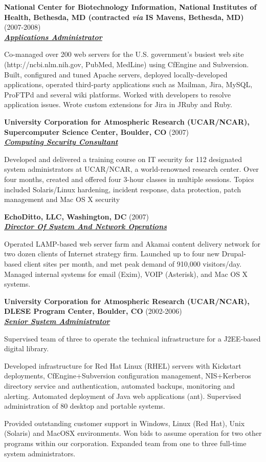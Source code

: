 \documentclass{article}
\newcommand{\employer}[3]{{ \textbf{#1} (#2)\\ \underline{\textbf{\emph{#3}}}\\ \nopagebreak }}
\newenvironment{achievements}{\begin{list}{\topsep 0pt \itemsep -2pt}} {\vspace*{4pt}\end{list}}
\begin{document}
\employer{National Center for Biotechnology Information, National Institutes
of Health, Bethesda, MD (contracted \emph{via} IS Mavens, Bethesda, MD)}{2007-2008}{Applications Administrator}
\begin{achievements}
   \item Co-managed over 200 web servers for the U.S. government's busiest web site (http://ncbi.nlm.nih.gov, PubMed, MedLine) using CfEngine and Subversion.  Built, configured and tuned Apache servers, deployed locally-developed applications, operated third-party applications such as Mailman, Jira, MySQL, ProFTPd and several wiki platforms.  Worked with developers to resolve application issues.  Wrote custom extensions for Jira in JRuby and Ruby.
\end{achievements}

\employer{University Corporation for Atmospheric Research (UCAR/NCAR),
Supercomputer Science Center, Boulder, CO}{2007}{Computing Security Consultant}

\begin{achievements}
\item Developed and delivered a training course on IT security for 112 designated system administrators at UCAR/NCAR, a world-renowned research center.  Over four months, created and offered four 3-hour classes in multiple sessions. Topics included Solaris/Linux hardening, incident response, data protection, patch management and Mac OS X security
\end{achievements}

\pagebreak
\employer{EchoDitto, LLC, Washington, DC}{2007}{Director Of System And Network Operations}
\begin{achievements}
  \item Operated LAMP-based web server farm and Akamai content delivery network for two dozen clients of Internet strategy firm.  Launched up to four new Drupal-based client sites per month, and met peak demand of 910,000 visitors/day.  Managed internal systems for email (Exim), VOIP (Asterisk), and Mac OS X systems. 
\end{achievements}
 
\employer{University Corporation for Atmospheric Research (UCAR/NCAR), DLESE
Program Center, Boulder, CO}{2002-2006}{Senior System Administrator}
\begin{achievements}
    \item Supervised team of three to operate the technical infrastructure for a J2EE-based digital library.  
    \item Developed infrastructure for Red Hat Linux (RHEL) servers with Kickstart deployments, CfEngine+Subversion configuration management, NIS+Kerberos directory service and authentication, automated backups, monitoring and alerting.  Automated deployment of Java web applications (ant). Supervised administration of 80 desktop and portable systems.  
    \item Provided outstanding customer support in Windows, Linux (Red Hat), Unix (Solaris) and MacOSX environments.  Won bids to assume operation for two other programs within our corporation.  Expanded team from one to three full-time system administrators. 
\end{achievements}
\end{document}
